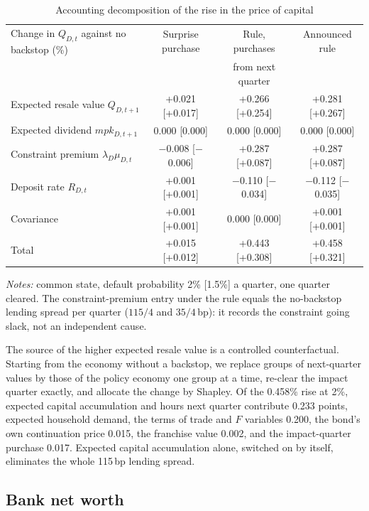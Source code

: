 \begin{table}[htbp]
\centering
\caption{Accounting decomposition of the rise in the price of capital}
\label{tab:app-capital}
\footnotesize
\setlength{\tabcolsep}{4pt}
\begin{tabular}{lccc}
\toprule
Change in $Q_{D,t}$ against no backstop (\%) & Surprise purchase & Rule, purchases & Announced rule \\
 & & from next quarter & \\
\midrule
Expected resale value $Q_{D,t+1}$ & +0.021 [+0.017] & +0.266 [+0.254] & +0.281 [+0.267] \\
Expected dividend $mpk_{D,t+1}$ & 0.000 [0.000] & 0.000 [0.000] & 0.000 [0.000] \\
Constraint premium $\lambda_D\mu_{D,t}$ & $-$0.008 [$-$0.006] & +0.287 [+0.087] & +0.287 [+0.087] \\
Deposit rate $R_{D,t}$ & +0.001 [+0.001] & $-$0.110 [$-$0.034] & $-$0.112 [$-$0.035] \\
Covariance & +0.001 [+0.001] & 0.000 [0.000] & +0.001 [+0.001] \\
\midrule
Total & +0.015 [+0.012] & +0.443 [+0.308] & +0.458 [+0.321] \\
\bottomrule
\end{tabular}
\par\medskip
\begin{minipage}{0.92\linewidth}\footnotesize
\emph{Notes:} common state, default probability 2\% [1.5\%] a quarter, one quarter cleared. The
constraint-premium entry under the rule equals the no-backstop lending spread per quarter
($115/4$ and $35/4$\,bp): it records the constraint going slack, not an independent cause.
\end{minipage}
\end{table}

The source of the higher expected resale value is a controlled counterfactual. Starting from
the economy without a backstop, we replace groups of next-quarter values by those of the policy
economy one group at a time, re-clear the impact quarter exactly, and allocate the change by
Shapley. Of the 0.458\% rise at 2\%, expected capital accumulation and hours next quarter
contribute 0.233 points, expected household demand, the terms of trade and $F$ variables 0.200,
the bond's own continuation price 0.015, the franchise value 0.002, and the impact-quarter
purchase 0.017. Expected capital accumulation alone, switched on by itself, eliminates the whole
115\,bp lending spread.

\subsection{Bank net worth}
\label{app:mech-networth}

